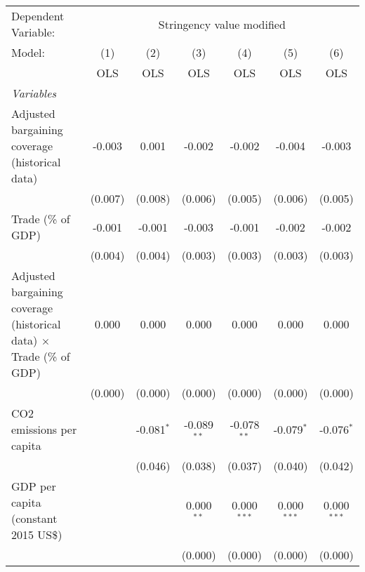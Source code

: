 
\begingroup
\centering
\begin{tabular}{lcccccc}
   \toprule
   Dependent Variable: & \multicolumn{6}{c}{Stringency value modified}\\
   Model:                                                                      & (1)     & (2)          & (3)           & (4)           & (5)           & (6)\\  
                                                                               &  OLS    & OLS          & OLS           & OLS           & OLS           & OLS\\  
   \midrule
   \emph{Variables}\\
   Adjusted bargaining coverage (historical data)                              & -0.003  & 0.001        & -0.002        & -0.002        & -0.004        & -0.003\\   
                                                                               & (0.007) & (0.008)      & (0.006)       & (0.005)       & (0.006)       & (0.005)\\   
   Trade (\% of GDP)                                                           & -0.001  & -0.001       & -0.003        & -0.001        & -0.002        & -0.002\\   
                                                                               & (0.004) & (0.004)      & (0.003)       & (0.003)       & (0.003)       & (0.003)\\   
   Adjusted bargaining coverage (historical data) $\times$ Trade (\% of GDP)   & 0.000   & 0.000        & 0.000         & 0.000         & 0.000         & 0.000\\   
                                                                               & (0.000) & (0.000)      & (0.000)       & (0.000)       & (0.000)       & (0.000)\\   
   CO2 emissions per capita                                                    &         & -0.081$^{*}$ & -0.089$^{**}$ & -0.078$^{**}$ & -0.079$^{*}$  & -0.076$^{*}$\\   
                                                                               &         & (0.046)      & (0.038)       & (0.037)       & (0.040)       & (0.042)\\   
   GDP per capita (constant 2015 US\$)                                         &         &              & 0.000$^{**}$  & 0.000$^{***}$ & 0.000$^{***}$ & 0.000$^{***}$\\   
                                                                               &         &              & (0.000)       & (0.000)       & (0.000)       & (0.000)\\   

\end{tabular}
